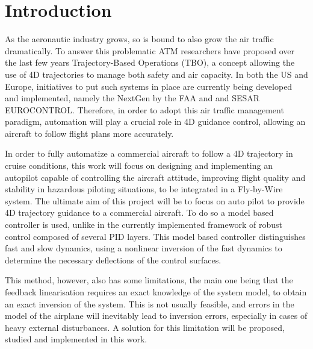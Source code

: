 
\section{Introduction}
\label{sec:intro}

As the aeronautic industry grows, so is bound to also grow the air traffic dramatically. To answer this problematic ATM researchers have proposed over the last few years Trajectory-Based Operations (TBO), a concept allowing the use of 4D trajectories to manage both safety and air capacity. In both the US and Europe, initiatives to put such systems in place are currently being developed and implemented, namely the NextGen by the FAA and and SESAR EUROCONTROL. Therefore, in order to adopt this air traffic management paradigm, automation will play a crucial role in 4D guidance control, allowing an aircraft to follow flight plans more accurately.

In order to fully automatize a commercial aircraft to follow a 4D trajectory in cruise conditions, this work will focus on designing and implementing an autopilot capable of controlling the aircraft attitude, improving flight quality and stability in hazardous piloting situations, to be integrated in a Fly-by-Wire system. The ultimate aim of this project will be to focus on auto pilot to provide 4D trajectory guidance to a commercial aircraft. To do so a model based controller is used, unlike in the currently implemented framework of robust control composed of several PID layers. This model based controller distinguishes fast and slow dynamics, using a nonlinear inversion of the fast dynamics to determine the necessary deflections of the control surfaces. 

This method, however, also has some limitations, the main one being that the feedback linearisation requires an exact knowledge of the system model, to obtain an exact inversion of the system. This is not usually feasible, and errors in the model of the airplane will inevitably lead to inversion errors, especially in cases of heavy external disturbances. A solution for this limitation will be proposed, studied and implemented in this work. 

